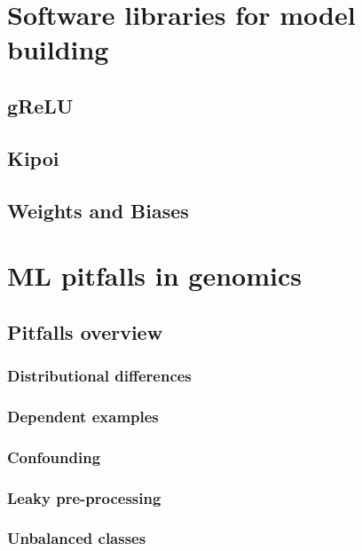\documentclass[
]{book}
\begin{document}
\part{Software libraries for model building}\label{part-software-libraries-for-model-building}

\chapter{gReLU}\label{grelu}

\chapter{Kipoi}\label{kipoi}

\chapter{Weights and Biases}\label{weights-and-biases}

\part{ML pitfalls in genomics}\label{part-ml-pitfalls-in-genomics}

\chapter{Pitfalls overview}\label{pitfalls-overview}

\section{Distributional differences}\label{distributional-differences}

\section{Dependent examples}\label{dependent-examples}

\section{Confounding}\label{confounding}

\section{Leaky pre-processing}\label{leaky-pre-processing}

\section{Unbalanced classes}\label{unbalanced-classes}
\end{document}
